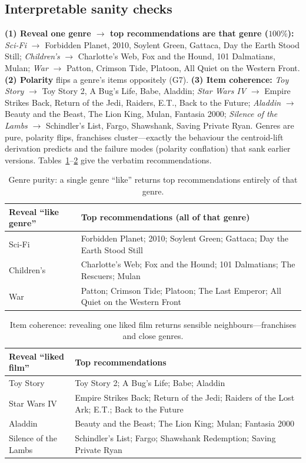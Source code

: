 \documentclass[11pt]{article}
\begin{document}
\subsection{Interpretable sanity checks}\label{sec:sanity}
\textbf{(1) Reveal one genre $\to$ top recommendations are that genre ($100\%$):} \emph{Sci-Fi} $\to$ Forbidden
Planet, 2010, Soylent Green, Gattaca, Day the Earth Stood Still; \emph{Children's} $\to$ Charlotte's Web, Fox and
the Hound, 101 Dalmatians, Mulan; \emph{War} $\to$ Patton, Crimson Tide, Platoon, All Quiet on the Western Front.
\textbf{(2) Polarity} flips a genre's items oppositely (G7). \textbf{(3) Item coherence:} \emph{Toy Story} $\to$
Toy Story 2, A Bug's Life, Babe, Aladdin; \emph{Star Wars IV} $\to$ Empire Strikes Back, Return of the Jedi,
Raiders, E.T., Back to the Future; \emph{Aladdin} $\to$ Beauty and the Beast, The Lion King, Mulan, Fantasia 2000;
\emph{Silence of the Lambs} $\to$ Schindler's List, Fargo, Shawshank, Saving Private Ryan. Genres are pure,
polarity flips, franchises cluster---exactly the behaviour the centroid-lift derivation predicts and the failure
modes (polarity conflation) that sank earlier versions. Tables~\ref{tab:genretitles}--\ref{tab:coh} give the
verbatim recommendations.

\begin{table}[h]\centering\small
\begin{tabular}{l p{10.2cm}}
\toprule
Reveal ``like genre'' & Top recommendations (all of that genre)\\
\midrule
Sci-Fi & Forbidden Planet; 2010; Soylent Green; Gattaca; Day the Earth Stood Still\\
Children's & Charlotte's Web; Fox and the Hound; 101 Dalmatians; The Rescuers; Mulan\\
War & Patton; Crimson Tide; Platoon; The Last Emperor; All Quiet on the Western Front\\
\bottomrule
\end{tabular}
\caption{Genre purity: a single genre ``like'' returns top recommendations entirely of that genre.}
\label{tab:genretitles}
\end{table}

\begin{table}[h]\centering\small
\begin{tabular}{l p{10.2cm}}
\toprule
Reveal ``liked film'' & Top recommendations\\
\midrule
Toy Story & Toy Story 2; A Bug's Life; Babe; Aladdin\\
Star Wars IV & Empire Strikes Back; Return of the Jedi; Raiders of the Lost Ark; E.T.; Back to the Future\\
Aladdin & Beauty and the Beast; The Lion King; Mulan; Fantasia 2000\\
Silence of the Lambs & Schindler's List; Fargo; Shawshank Redemption; Saving Private Ryan\\
\bottomrule
\end{tabular}
\caption{Item coherence: revealing one liked film returns sensible neighbours---franchises and close genres.}
\label{tab:coh}
\end{table}
\end{document}
